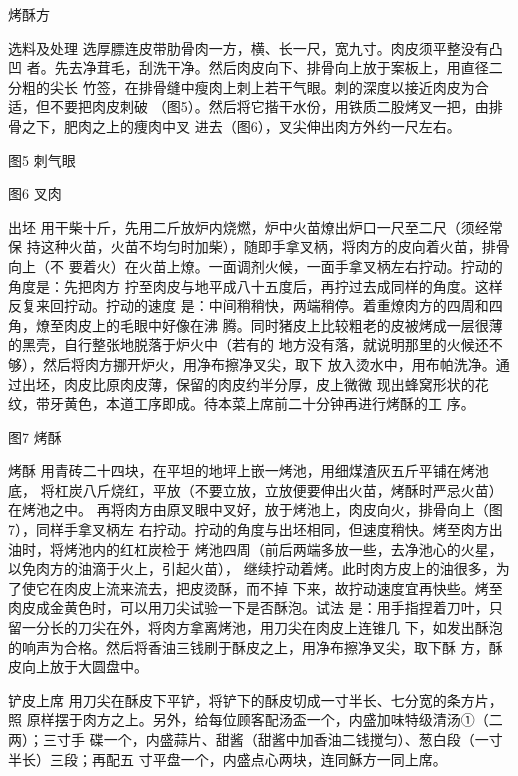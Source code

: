 \begin{recipe}{烤酥方}

\ingredients


\cooking

\step 选料及处理 选厚膘连皮带肋骨肉一方，横、长一尺，宽九寸。肉皮须平整没有凸凹
者。先去净茸毛，刮洗干净。然后肉皮向下、排骨向上放于案板上，用直径二分粗的尖长
竹签，在排骨缝中瘦肉上刺上若干气眼。刺的深度以接近肉皮为合适，但不要把肉皮刺破
（图5）。然后将它揩干水份，用铁质二股烤叉一把，由排骨之下，肥肉之上的痩肉中叉
进去（图6），叉尖伸出肉方外约一尺左右。

图5 刺气眼

图6 叉肉

\step 出坯 用干柴十斤，先用二斤放炉内烧燃，炉中火苗燎出炉口一尺至二尺（须经常保
持这种火苗，火苗不均匀时加柴），随即手拿叉柄，将肉方的皮向着火苗，排骨向上（不
要着火）在火苗上燎。一面调剂火候，一面手拿叉柄左右拧动。拧动的角度是：先把肉方
拧至肉皮与地平成八十五度后，再拧过去成同样的角度。这样反复来回拧动。拧动的速度
是：中间稍稍快，两端稍停。着重燎肉方的四周和四角，燎至肉皮上的毛眼中好像在沸
腾。同时猪皮上比较粗老的皮被烤成一层很薄的黑壳，自行整张地脱落于炉火中（若有的
地方没有落，就说明那里的火候还不够），然后将肉方挪开炉火，用净布擦净叉尖，取下
放入烫水中，用布帕洗净。通过出坯，肉皮比原肉皮薄，保留的肉皮约半分厚，皮上微微
现出蜂窝形状的花纹，带牙黄色，本道工序即成。待本菜上席前二十分钟再进行烤酥的工
序。

图7 烤酥

\step 烤酥 用青砖二十四块，在平坦的地坪上嵌一烤池，用细煤渣灰五斤平铺在烤池底，
将杠炭八斤烧红，平放（不要立放，立放便要伸出火苗，烤酥时严忌火苗）在烤池之中。
再将肉方由原叉眼中叉好，放于烤池上，肉皮向火，排骨向上（图7），同样手拿叉柄左
右拧动。拧动的角度与出坯相同，但速度稍快。烤至肉方出油时，将烤池内的红杠炭检于
烤池四周（前后两端多放一些，去净池心的火星，以免肉方的油滴于火上，引起火苗），
继续拧动着烤。此时肉方皮上的油很多，为了使它在肉皮上流来流去，把皮烫酥，而不掉
下来，故拧动速度宜再快些。烤至肉皮成金黄色时，可以用刀尖试验一下是否酥泡。试法
是：用手指捏着刀叶，只留一分长的刀尖在外，将肉方拿离烤池，用刀尖在肉皮上连锥几
下，如发出酥泡的响声为合格。然后将香油三钱刷于酥皮之上，用净布擦净叉尖，取下酥
方，酥皮向上放于大圆盘中。

\step 铲皮上席 用刀尖在酥皮下平铲，将铲下的酥皮切成一寸半长、七分宽的条方片，照
原样摆于肉方之上。另外，给每位顾客配汤盃一个，内盛加味特级清汤①（二两）；三寸手
碟一个，内盛蒜片、甜酱（甜酱中加香油二钱搅匀）、葱白段（一寸半长）三段；再配五
寸平盘一个，内盛点心两块，连同穌方一同上席。


\end{recipe}
